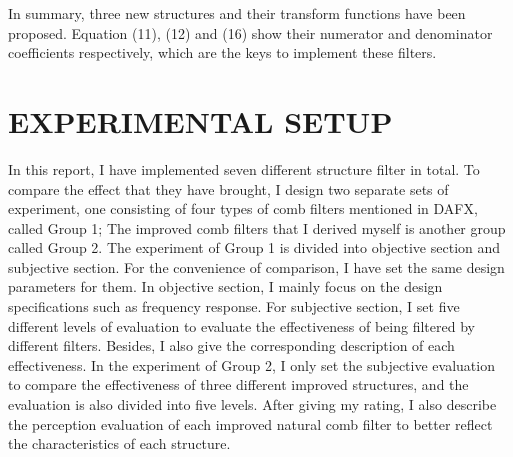 \documentclass[a4paper]{tufte-handout} %
\begin{document}
In summary, three new structures and their transform functions have been proposed. Equation (11), (12) and (16) show their numerator and denominator coefficients respectively, which are the keys to implement these filters.

\section{EXPERIMENTAL SETUP}
In this report, I have implemented seven different structure filter in total. To compare the effect that they have brought, I design two separate sets of experiment, one consisting of four types of comb filters mentioned in DAFX, called Group 1; The improved comb filters that I derived myself is another group called Group 2.
The experiment of Group 1 is divided into objective section and subjective section. For the convenience of comparison, I have set the same design parameters for them. In objective section, I mainly focus on the design specifications such as frequency response. For subjective section, I set five different levels of evaluation to evaluate the effectiveness of being filtered by different filters. Besides, I also give the corresponding description of each effectiveness.
In the experiment of Group 2, I only set the subjective evaluation to compare the effectiveness of three different improved structures, and the evaluation is also divided into five levels. After giving my rating, I also describe the perception evaluation of each improved natural comb filter to better reflect the characteristics of each structure.
\end{document}
